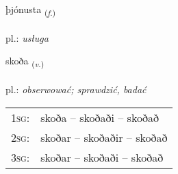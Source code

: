 \documentclass[frontgrid, backgrid]{flacards}\usepackage[]{graphicx}\usepackage[]{xcolor}
\begin{document}
\renewcommand{\blhead}{\vskip5pt {\small\bfseries\footnotesize Nafnorð | rzeczownik }}
\renewcommand{\bcfoot}{\vskip5pt \hspace{2pt}{\small\bfseries\footnotesize 1K}}


{þjónusta \small{\textsubscript{(\textit{f.})}} \\[1ex] %
\textphonetic{[θjouːnʏsta]} \\
pl.: \emph{usługa} \\  [2ex]
\renewcommand*{\arraystretch}{0.8}
}

\renewcommand{\flhead}{\vskip5pt \fboxsep=0pt {\small\bfseries\footnotesize Sagnorð | czasownik}}
\renewcommand{\fcfoot}{\vskip5pt \fboxsep=0pt \hspace{2pt}{\small\bfseries\footnotesize 1K}}

\renewcommand{\blhead}{\vskip5pt {\small\bfseries\footnotesize Sagnorð | czasownik }}
\renewcommand{\bcfoot}{\vskip5pt \hspace{2pt}{\small\bfseries\footnotesize 1K}}


{skoða \small{\textsubscript{(\textit{v.})}} \\[1ex] %
\textphonetic{[skɔːða]} \\
pl.: \emph{obserwować; sprawdzić, badać} \\  [2ex]
\renewcommand*{\arraystretch}{0.8}
\begin{tabular}{p{1cm}l}
\textsc{1sg}: & skoða -- skoðaði -- skoðað \\ 
\textsc{2sg}: & skoðar -- skoðaðir -- skoðað \\ 
\textsc{3sg}: & skoðar -- skoðaði -- skoðað \\ 
\end{tabular}
}
\end{document}
